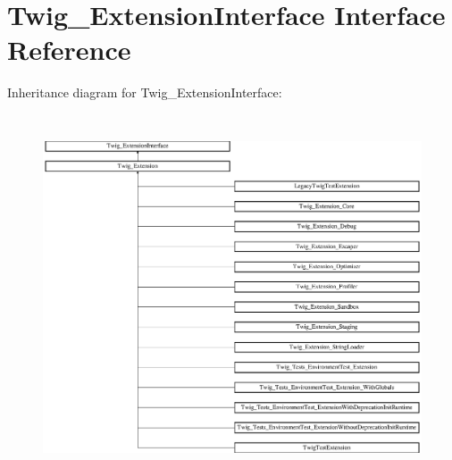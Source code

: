 \hypertarget{interfaceTwig__ExtensionInterface}{}\section{Twig\+\_\+\+Extension\+Interface Interface Reference}
\label{interfaceTwig__ExtensionInterface}
Inheritance diagram for Twig\+\_\+\+Extension\+Interface\+:\begin{figure}[H]
\begin{center}
\leavevmode
\includegraphics[height=10.847458cm]{interfaceTwig__ExtensionInterface}
\end{center}
\end{figure}
